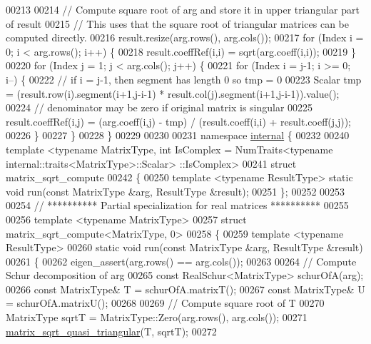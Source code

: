 \begin{DoxyCode}
00213 
00214   \textcolor{comment}{// Compute square root of arg and store it in upper triangular part of result}
00215   \textcolor{comment}{// This uses that the square root of triangular matrices can be computed directly.}
00216   result.resize(arg.rows(), arg.cols());
00217   \textcolor{keywordflow}{for} (Index i = 0; i < arg.rows(); i++) \{
00218     result.coeffRef(i,i) = sqrt(arg.coeff(i,i));
00219   \}
00220   \textcolor{keywordflow}{for} (Index j = 1; j < arg.cols(); j++) \{
00221     \textcolor{keywordflow}{for} (Index i = j-1; i >= 0; i--) \{
00222       \textcolor{comment}{// if i = j-1, then segment has length 0 so tmp = 0}
00223       Scalar tmp = (result.row(i).segment(i+1,j-i-1) * result.col(j).segment(i+1,j-i-1)).value();
00224       \textcolor{comment}{// denominator may be zero if original matrix is singular}
00225       result.coeffRef(i,j) = (arg.coeff(i,j) - tmp) / (result.coeff(i,i) + result.coeff(j,j));
00226     \}
00227   \}
00228 \}
00229 
00230 
00231 \textcolor{keyword}{namespace }\hyperlink{namespaceinternal}{internal} \{
00232 
00240 template <typename MatrixType, int IsComplex = NumTraits<typename internal::traits<MatrixType>::Scalar>
      ::IsComplex>
00241 \textcolor{keyword}{struct }matrix\_sqrt\_compute
00242 \{
00250   \textcolor{keyword}{template} <\textcolor{keyword}{typename} ResultType> \textcolor{keyword}{static} \textcolor{keywordtype}{void} run(\textcolor{keyword}{const} MatrixType &arg, ResultType &result);    
00251 \};
00252 
00253 
00254 \textcolor{comment}{// ********** Partial specialization for real matrices **********}
00255 
00256 \textcolor{keyword}{template} <\textcolor{keyword}{typename} MatrixType>
00257 \textcolor{keyword}{struct }matrix\_sqrt\_compute<MatrixType, 0>
00258 \{
00259   \textcolor{keyword}{template} <\textcolor{keyword}{typename} ResultType>
00260   \textcolor{keyword}{static} \textcolor{keywordtype}{void} run(\textcolor{keyword}{const} MatrixType &arg, ResultType &result)
00261   \{
00262     eigen\_assert(arg.rows() == arg.cols());
00263 
00264     \textcolor{comment}{// Compute Schur decomposition of arg}
00265     \textcolor{keyword}{const} RealSchur<MatrixType> schurOfA(arg);  
00266     \textcolor{keyword}{const} MatrixType& T = schurOfA.matrixT();
00267     \textcolor{keyword}{const} MatrixType& U = schurOfA.matrixU();
00268     
00269     \textcolor{comment}{// Compute square root of T}
00270     MatrixType sqrtT = MatrixType::Zero(arg.rows(), arg.cols());
00271     \hyperlink{namespace_eigen_a2f490197e16df831683018e383e29346}{matrix\_sqrt\_quasi\_triangular}(T, sqrtT);
00272     

\end{DoxyCode}
